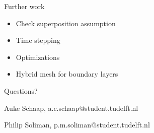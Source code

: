 \documentclass[aspectratio=43]{beamer}
\begin{document}
\begin{frame}[fragile]{Further work} %
\begin{itemize}
    \item Check superposition assumption
    \item Time stepping
    \item Optimizations
    \item Hybrid mesh for boundary layers
    
    
\end{itemize}
\end{frame}


\begin{frame}[fragile]{Questions?} %

Auke Schaap, a.c.schaap@student.tudelft.nl

Philip Soliman, p.m.soliman@student.tudelft.nl


\end{frame}
\end{document}
